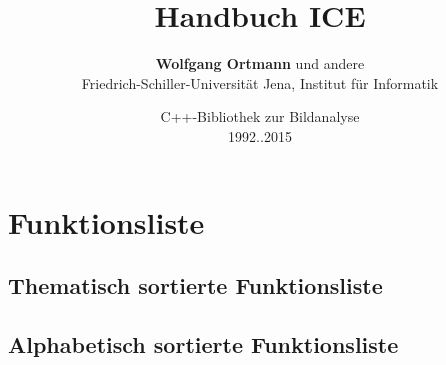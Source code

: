 \documentclass[10pt,titlepage]{article}
\begin{document}
\title{Handbuch ICE}
\author{{\bf Wolfgang Ortmann} und andere\\
Friedrich-Schiller-Universität Jena, Institut für Informatik}
\date{C++-Bibliothek zur Bildanalyse\\
1992..2015}
\maketitle



\newpage

\newpage

\newpage

\newpage

\newpage

\newpage

\newpage

\newpage

\newpage

\newpage

\newpage

\newpage

\newpage

\newpage

\newpage

\newpage

\newpage

\newpage

\newpage

\newpage

\newpage
%

\newpage

\newpage

\newpage

\newpage
%

\newpage

\newpage

\newpage

\newpage
\section{Funktionsliste}
\subsection{Thematisch sortierte Funktionsliste}

\newpage
\subsection{Alphabetisch sortierte Funktionsliste}

\end{document}
